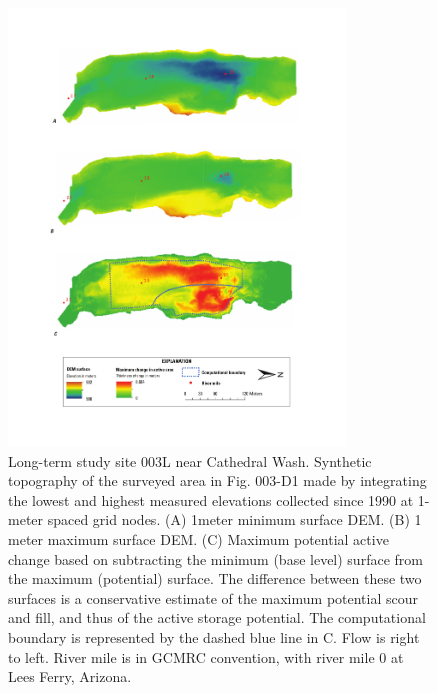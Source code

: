\begin{figure}[H]
	\centering
	\includegraphics[width=0.8\textwidth]{Fig2}
	\caption{Long-term study site 003L near Cathedral Wash. Synthetic topography of the surveyed area in Fig. 003-D1 made by integrating the lowest and highest measured elevations collected since 1990 at 1-meter spaced grid nodes. (A) 1meter minimum surface DEM. (B) 1 meter maximum surface DEM. (C) Maximum potential active change based on subtracting the minimum (base level) surface from the maximum (potential) surface. The difference between these two surfaces is a conservative estimate of the maximum potential scour and fill, and thus of the active storage potential. The computational boundary is represented by the dashed blue line in C. Flow is right to left. River mile is in GCMRC convention, with river mile 0 at Lees Ferry, Arizona.}
\end{figure}


